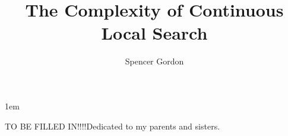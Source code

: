 \documentclass[tocnosub,noragright,centerchapter,12pt,mixcasechap]{uiucecethesis09}
\title{The Complexity of Continuous Local Search}
\author{Spencer Gordon}
\theoremstyle{plain}
\theoremstyle{definition}
\begin{document}
%
\maketitle

\parindent 1em%

\frontmatter

%
\begin{abstract}

\end{abstract}


%
\begin{dedication}
TO BE FILLED IN!!!!Dedicated to my parents and sisters.
\end{dedication}

%
\begin{acknowledgments}
\end{acknowledgments}

%
\tableofcontents

%



%
\end{document}
